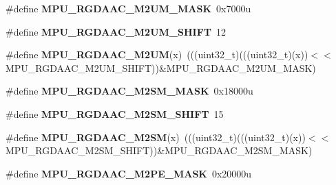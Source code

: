 \begin{DoxyCompactItemize}
\item 
\#define {\bfseries M\+P\+U\+\_\+\+R\+G\+D\+A\+A\+C\+\_\+\+M2\+U\+M\+\_\+\+M\+A\+SK}~0x7000u\hypertarget{group__MPU__Register__Masks_ga8d7b4cc87aa01ac1fc57eee990df39c7}{}\label{group__MPU__Register__Masks_ga8d7b4cc87aa01ac1fc57eee990df39c7}

\item 
\#define {\bfseries M\+P\+U\+\_\+\+R\+G\+D\+A\+A\+C\+\_\+\+M2\+U\+M\+\_\+\+S\+H\+I\+FT}~12\hypertarget{group__MPU__Register__Masks_ga1d5c046770993c99be4542472930ca76}{}\label{group__MPU__Register__Masks_ga1d5c046770993c99be4542472930ca76}

\item 
\#define {\bfseries M\+P\+U\+\_\+\+R\+G\+D\+A\+A\+C\+\_\+\+M2\+UM}(x)~(((uint32\+\_\+t)(((uint32\+\_\+t)(x))$<$$<$M\+P\+U\+\_\+\+R\+G\+D\+A\+A\+C\+\_\+\+M2\+U\+M\+\_\+\+S\+H\+I\+FT))\&M\+P\+U\+\_\+\+R\+G\+D\+A\+A\+C\+\_\+\+M2\+U\+M\+\_\+\+M\+A\+SK)\hypertarget{group__MPU__Register__Masks_gae2624802b0f6612197ae07aad8864b66}{}\label{group__MPU__Register__Masks_gae2624802b0f6612197ae07aad8864b66}

\item 
\#define {\bfseries M\+P\+U\+\_\+\+R\+G\+D\+A\+A\+C\+\_\+\+M2\+S\+M\+\_\+\+M\+A\+SK}~0x18000u\hypertarget{group__MPU__Register__Masks_ga6add3ff0b896e284766090212deee537}{}\label{group__MPU__Register__Masks_ga6add3ff0b896e284766090212deee537}

\item 
\#define {\bfseries M\+P\+U\+\_\+\+R\+G\+D\+A\+A\+C\+\_\+\+M2\+S\+M\+\_\+\+S\+H\+I\+FT}~15\hypertarget{group__MPU__Register__Masks_ga3ad37821b5be6daf16f1a497562a34e8}{}\label{group__MPU__Register__Masks_ga3ad37821b5be6daf16f1a497562a34e8}

\item 
\#define {\bfseries M\+P\+U\+\_\+\+R\+G\+D\+A\+A\+C\+\_\+\+M2\+SM}(x)~(((uint32\+\_\+t)(((uint32\+\_\+t)(x))$<$$<$M\+P\+U\+\_\+\+R\+G\+D\+A\+A\+C\+\_\+\+M2\+S\+M\+\_\+\+S\+H\+I\+FT))\&M\+P\+U\+\_\+\+R\+G\+D\+A\+A\+C\+\_\+\+M2\+S\+M\+\_\+\+M\+A\+SK)\hypertarget{group__MPU__Register__Masks_ga143287bba1d7668b4c1fa76a2493afd3}{}\label{group__MPU__Register__Masks_ga143287bba1d7668b4c1fa76a2493afd3}

\item 
\#define {\bfseries M\+P\+U\+\_\+\+R\+G\+D\+A\+A\+C\+\_\+\+M2\+P\+E\+\_\+\+M\+A\+SK}~0x20000u\hypertarget{group__MPU__Register__Masks_ga6874e60f0d77ebd63d294605ff99f240}{}\label{group__MPU__Register__Masks_ga6874e60f0d77ebd63d294605ff99f240}


\end{DoxyCompactItemize}
